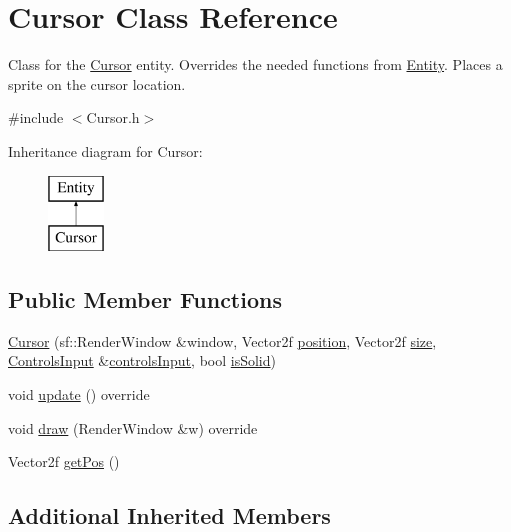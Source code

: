 \hypertarget{class_cursor}{}\section{Cursor Class Reference}
\label{class_cursor}


Class for the \hyperlink{class_cursor}{Cursor} entity. Overrides the needed functions from \hyperlink{class_entity}{Entity}. Places a sprite on the cursor location.  




{\ttfamily \#include $<$Cursor.\+h$>$}

Inheritance diagram for Cursor\+:\begin{figure}[H]
\begin{center}
\leavevmode
\includegraphics[height=2.000000cm]{class_cursor}
\end{center}
\end{figure}
\subsection*{Public Member Functions}
\begin{DoxyCompactItemize}
\item 
\hyperlink{class_cursor_ac1cd6075c59b1fd16bf87bb9a366cca9}{Cursor} (sf\+::\+Render\+Window \&window, Vector2f \hyperlink{class_entity_a6af9d6498134ad0906011778bc5736db}{position}, Vector2f \hyperlink{class_entity_ae9a0a364c85f91ade5088b3610131417}{size}, \hyperlink{struct_controls_input}{Controls\+Input} \&\hyperlink{classcontrols_input}{controls\+Input}, bool \hyperlink{class_entity_af1b0754c9d5f4afa73834b23c6437101}{is\+Solid})
\item 
void \hyperlink{class_cursor_a2450501ae27244acb089209436d5b112}{update} () override
\item 
void \hyperlink{class_cursor_a31c09a077d14237953223980197fdd17}{draw} (Render\+Window \&w) override
\item 
Vector2f \hyperlink{class_cursor_a214e135fad5e686f5bcfea34806c8730}{get\+Pos} ()
\end{DoxyCompactItemize}
\subsection*{Additional Inherited Members}


